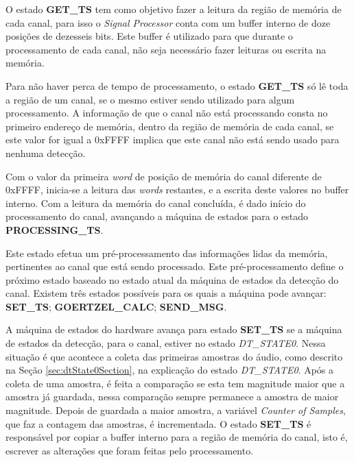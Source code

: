 \documentclass[monografia]{subfiles}
\begin{document}
			\label{sec:hardwareStateGETTS}
				O estado \textbf{GET\_TS} tem como objetivo fazer a leitura da região de memória de cada canal, para isso o \textit{Signal Processor} conta com
				um buffer interno de doze posições de dezesseis bits. Este buffer é utilizado para que durante o processamento de cada canal, não seja necessário fazer
				leituras ou escrita na memória. 

				Para não haver perca de tempo de processamento, o estado \textbf{GET\_TS} só lê toda a região de um canal, se o mesmo estiver sendo utilizado
				para algum processamento. A informação de que o canal não está processando consta no primeiro endereço de memória, dentro da região de memória
				de cada canal, se este valor for igual a 0xFFFF implica que este canal não está sendo usado para nenhuma detecção.

				Com o valor da primeira \textit{word} de posição de memória do canal diferente de 0xFFFF, inicia-se a leitura das \textit{words} restantes, 
				e a escrita deste valores no buffer interno. Com a leitura da memória do canal concluída, é dado início do processamento do canal, avançando a
				máquina de estados para o estado \textbf{PROCESSING\_TS}.

			\label{sec:hardwareStatePROCESSINGTS}
				Este estado efetua um pré-processamento das informações lidas da memória, pertinentes ao canal que está sendo processado. Este pré-processamento
				define o próximo estado baseado no estado atual da máquina de estados da detecção do canal. Existem três estados possíveis para os quais a máquina 
				pode avançar: \textbf{SET\_TS}; \textbf{GOERTZEL\_CALC}; \textbf{SEND\_MSG}.

				A máquina de estados do hardware avança para estado \textbf{SET\_TS} se a máquina de estados da detecção, para o canal,
				estiver no estado \textit{DT\_STATE0}. Nessa situação é que acontece a coleta das primeiras amostras do áudio, como descrito na Seção 
				\ref{sec:dtState0Section}, na explicação do estado \textit{DT\_STATE0}.
				Após a coleta de uma amostra, é feita a comparação se esta tem magnitude maior que a amostra já guardada,
				nessa comparação sempre permanece a amostra de maior magnitude. Depois de guardada a maior amostra, a variável \textit{Counter of Samples},
				que faz a contagem das amostras, é incrementada. O estado \textbf{SET\_TS} é responsável por copiar a buffer interno para a  região de 
				memória do canal, isto é, escrever as alterações que foram feitas pelo processamento.
\end{document}
